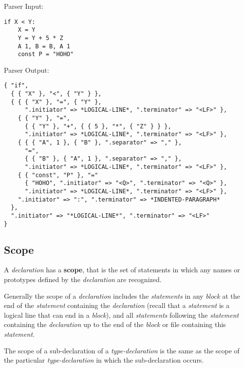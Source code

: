 \documentclass[12pt]{article}
\newcommand{\key}[1]{{\rm \bfseries #1}}
\newenvironment{indpar}[1][0.3in]%
	{\begin{list}{}%
		     {\setlength{\itemsep}{0in}%
		      \setlength{\topsep}{0in}%
		      \setlength{\parsep}{1ex}%
		      \setlength{\labelwidth}{#1}%
		      \setlength{\leftmargin}{#1}%
		      \addtolength{\leftmargin}{\labelsep}}%
	 \item}%
	{\end{list}}
\begin{document}
\begin{indpar}[1em]
Parser Input:
\begin{indpar}[1em]\begin{verbatim}
if X < Y:
    X = Y
    Y = Y + 5 * Z
    A 1, B = B, A 1
    const P = "HOHO"
\end{verbatim}\end{indpar}

\medskip

Parser Output:
\begin{indpar}[1em]\begin{verbatim}
{ "if",
  { { "X" }, "<", { "Y" } },
  { { { "X" }, "=", { "Y" },
      ".initiator" => *LOGICAL-LINE*, ".terminator" => "<LF>" },
    { { "Y" }, "=",
      { { "Y" }, "+", { { 5 }, "*", { "Z" } } },
      ".initiator" => *LOGICAL-LINE*, ".terminator" => "<LF>" },
    { { { "A", 1 }, { "B" }, ".separator" => "," },
      "=",
      { { "B" }, { "A", 1 }, ".separator" => "," },
      ".initiator" => *LOGICAL-LINE*, ".terminator" => "<LF>" },
    { { "const", "P" }, "="
      { "HOHO", ".initiator" => "<Q>", ".terminator" => "<Q>" },
      ".initiator" => *LOGICAL-LINE*, ".terminator" => "<LF>" },
    ".initiator" => ":", ".terminator" => *INDENTED-PARAGRAPH*
  },
  ".initiator" => "*LOGICAL-LINE*", ".terminator" => "<LF>"
}

\end{verbatim}\end{indpar}
\end{indpar}

\subsection{Scope}
\label{SCOPE}

A {\em declaration} has a \key{scope},
that is the set of statements in which any
names or prototypes defined by the {\em declaration}
are recognized.

Generally the scope of a {\em declaration} includes the {\em statements}
in any {\em block} at the end of the {\em statement}
containing the {\em declaration} (recall that a {\em statement} is a
logical line that can end in a {\em block}), and
all {\em statements} following the {\em statement} containing
the {\em declaration} up to the end of the {\em block} or file
containing this {\em statement}.

The scope of a sub-declaration of a {\em type-declaration} is
the same as the scope of the particular {\em type-declaration}
in which the sub-declaration occurs.
\end{document}
